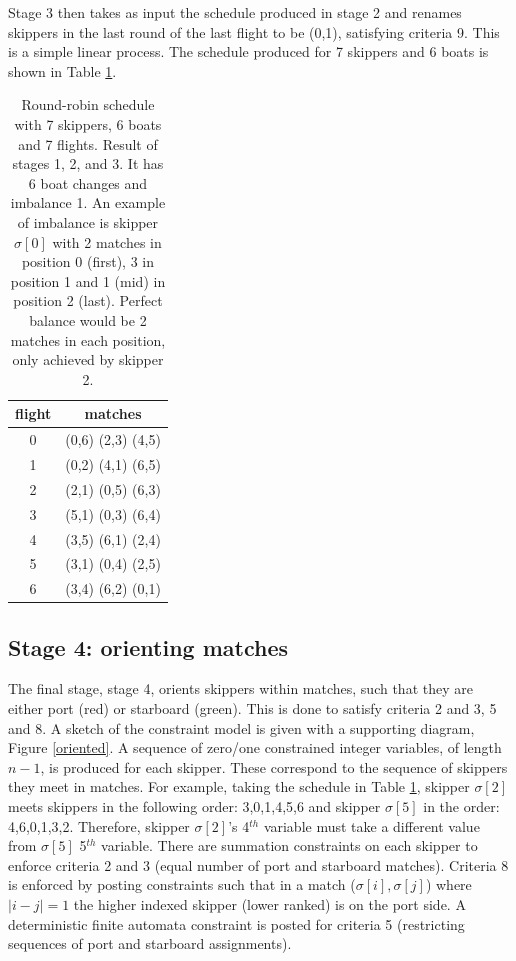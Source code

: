 \documentclass{llncs}
\begin{document}
\noindent
Stage 3 then takes as input the schedule produced in stage 2 and renames skippers in the last round of the last flight to be (0,1), satisfying criteria 9. This is a simple linear process. The schedule produced for 7 skippers and 6 boats is shown in Table \ref{tab2}.

\begin{table}[h]
\begin{center}
\begin{tabular}{cc} \\ 
flight & matches \\ \hline
0 & (0,6) (2,3) (4,5) \\
1 & (0,2) (4,1) (6,5) \\
2 & (2,1) (0,5) (6,3) \\
3 & (5,1) (0,3) (6,4) \\
4 & (3,5) (6,1) (2,4) \\
5 & (3,1) (0,4) (2,5) \\
6 & (3,4) (6,2) (0,1) \\ \hline
\end{tabular}
\end{center}
\caption{Round-robin schedule with 7 skippers, 6 boats and 7 flights. Result of stages 1, 2, and 3. It has 6 boat changes and imbalance 1. An example of imbalance is skipper $\sigma[{0}]$ with 2 matches in position 0 (first), 3 in position 1 and 1 (mid) in position 2 (last). Perfect balance would be 2 matches in each position, only achieved by skipper 2.}
\label{tab2}
\end{table}

\subsection{Stage 4: orienting matches}
The final stage, stage 4, orients skippers within matches, such that they are either port (red) or starboard (green). This is done to satisfy criteria 2 and 3, 5 and 8. A sketch of the constraint model is given with a supporting diagram, Figure \ref{oriented}.  A sequence of zero/one constrained integer variables, of length $n-1$, is produced for each skipper. These correspond to the sequence of skippers they meet in matches. For example, taking the schedule in Table \ref{tab2}, skipper $\sigma[{2}]$ meets skippers in the following order: 3,0,1,4,5,6 and skipper $\sigma[{5}]$ in the order: 4,6,0,1,3,2. Therefore, skipper $\sigma[{2}]$'s 4$^{th}$ variable must take a different value from $\sigma[{5}]$ 5$^{th}$ variable. There are summation constraints on each skipper to enforce criteria 2 and 3 (equal number of port and starboard matches). Criteria 8 is enforced by posting constraints such that in a match ($\sigma[{i}],\sigma[{j}]$) where $|i - j| = 1$ the higher indexed skipper (lower ranked) is on the port side. A deterministic finite automata constraint is posted for criteria 5 (restricting sequences of port and starboard assignments). 
\end{document}
